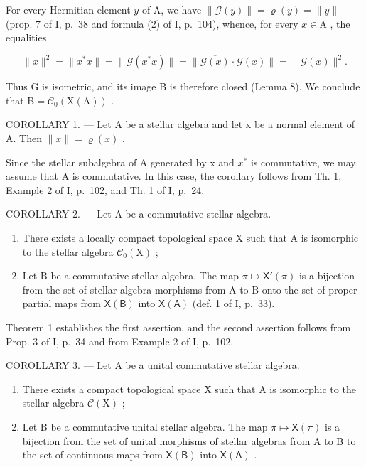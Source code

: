 For every Hermitian element \(y\) of A, we have \(\| \mathcal{G}(y)\| = \varrho (y) = \| y\|\) (prop. 7 of I, p.~38 and formula (2) of I, p.~104), whence, for every \(x\in \mathrm{A}\) , the equalities

\[
\| x \| ^ {2} = \| x ^ {*} x \| = \| \mathcal {G} (x ^ {*} x) \| = \| \overline {{\mathcal {G} (x)}} \cdot \mathcal {G} (x) \| = \| \mathcal {G} (x) \| ^ {2}.
\]

Thus G is isometric, and its image B is therefore closed (Lemma 8). We conclude that \(\mathrm{B} = \mathcal{C}_{0}(\mathrm{X}(\mathrm{A}))\) .

COROLLARY 1. --- Let A be a stellar algebra and let x be a normal element of A. Then \(\|x\| = \varrho(x)\) .

Since the stellar subalgebra of A generated by x and \(x^{*}\) is commutative, we may assume that A is commutative. In this case, the corollary follows from Th. 1, Example 2 of I, p.~102, and Th. 1 of I, p.~24.

COROLLARY 2. --- Let A be a commutative stellar algebra.

\begin{enumerate}
\def\labelenumi{\alph{enumi})}
\item
  There exists a locally compact topological space X such that A is isomorphic to the stellar algebra \(\mathcal{C}_{0}(\mathrm{X})\) ;
\item
  Let B be a commutative stellar algebra. The map \(\pi \mapsto \mathsf{X}'(\pi)\) is a bijection from the set of stellar algebra morphisms from A to B onto the set of proper partial maps from \(\mathsf{X}(\mathsf{B})\) into \(\mathsf{X}(\mathsf{A})\) (def. 1 of I, p.~33).
\end{enumerate}

Theorem 1 establishes the first assertion, and the second assertion follows from Prop. 3 of I, p.~34 and from Example 2 of I, p.~102.

COROLLARY 3. --- Let A be a unital commutative stellar algebra.

\begin{enumerate}
\def\labelenumi{\alph{enumi})}
\item
  There exists a compact topological space X such that A is isomorphic to the stellar algebra \(\mathcal{C}(\mathrm{X})\) ;
\item
  Let B be a commutative unital stellar algebra. The map \(\pi \mapsto \mathsf{X}(\pi)\) is a bijection from the set of unital morphisms of stellar algebras from A to B to the set of continuous maps from \(\mathsf{X}(\mathsf{B})\) into \(\mathsf{X}(\mathsf{A})\) .
\end{enumerate}

